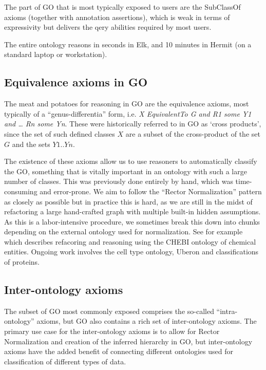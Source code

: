\documentclass{llncs}
\begin{document}
The part of GO that is most typically exposed to users are the
SubClassOf axioms (together with annotation assertions), which is weak
in terms of expressivity but delivers the qery abilities required by
most users.

The entire ontology reasons in seconds in Elk\cite{kazakov2012elk}, and 10
minutes in Hermit (on a standard laptop or workstation).

\subsection{Equivalence axioms in GO}

The meat and potatoes for reasoning in GO are the equivalence axioms,
most typically of a ``genus-differentia'' form, i.e. \emph{X
  EquivalentTo G and R1 some Y1 and … Rn some Yn}. These were
historically referred to in GO as ‘cross
products’\cite{Mungall2010GOXP}, since the set of such defined classes
$X$ are a subset of the cross-product of the set $G$ and the sets
$Y1..Yn$.

The existence of these axioms allow us to use reasoners to
automatically classify the GO, something that is vitally important in
an ontology with such a large number of classes. This was previously
done entirely by hand, which was time-consuming and error-prone. We
aim to follow the ``Rector Normalization''
pattern\cite{rector_modularisation_2003} as closely as possible but in
practice this is hard, as we are still in the midst of refactoring a
large hand-crafted graph with multiple built-in hidden assumptions. As
this is a labor-intensive procedure, we sometimes break this down into
chunks depending on the external ontology used for normalization. See
for example \cite{Hill2013} which describes refacoring and reasoning
using the CHEBI ontology of chemical entities. Ongoing work involves
the cell type ontology, Uberon and classifications of proteins.

\subsection{Inter-ontology axioms}

The subset of GO most commonly exposed comprises the so-called
``intra-ontology'' axioms, but GO also contains a rich set of
inter-ontology axioms. The primary use case for the inter-ontology
axioms is to allow for Rector Normalization and creation of the
inferred hierarchy in GO, but inter-ontology axioms have the added
benefit of connecting different ontologies used for classification of
different types of data.
\end{document}
